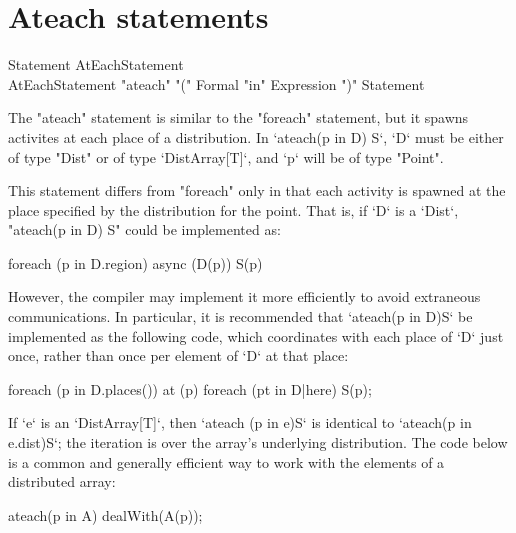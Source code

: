 \section{Ateach statements}\label{ateach-section}

\begin{grammar}
Statement \: AtEachStatement \\
AtEachStatement \:
      \xcd"ateach" \xcd"(" Formal \xcd"in" Expression \xcd")"
         Statement 
\end{grammar}

The \xcd"ateach" statement is similar to the \xcd"foreach"
statement, but it spawns activites at each place of a distribution. 
In \xcd`ateach(p in D) S`, 
\xcd`D` must be either of type \xcd"Dist" or of type
\xcd`DistArray[T]`, 
and \xcd`p` will be of type \xcd"Point".

This statement differs from \xcd"foreach" only in
that each activity is spawned at the place specified by the
distribution for the point. That is, if \xcd`D` is a \xcd`Dist`, 
\xcd"ateach(p in D) S" could be implemented as:
\begin{xten}
foreach (p in D.region) 
  async (D(p)) S(p)
\end{xten}

However, the compiler may implement it more efficiently to avoid extraneous
communications.  In particular, it is recommended that \xcd`ateach(p in D)S`
be implemented as the following code, which coordinates with each place of
\xcd`D` just once, rather than once per element of \xcd`D` at that place: 

\begin{xten}
foreach (p in D.places()) at (p) {
    foreach (pt in D|here) {
        S(p);
    }
}
\end{xten}

If \xcd`e` is an \xcd`DistArray[T]`, then \xcd`ateach (p in e)S` is identical to
\xcd`ateach(p in e.dist)S`; the iteration is over the array's underlying
distribution.   
The code below is a common and generally efficient way to work with the
elements of a distributed array:
\begin{xten}
ateach(p in A) 
  dealWith(A(p));
\end{xten}




